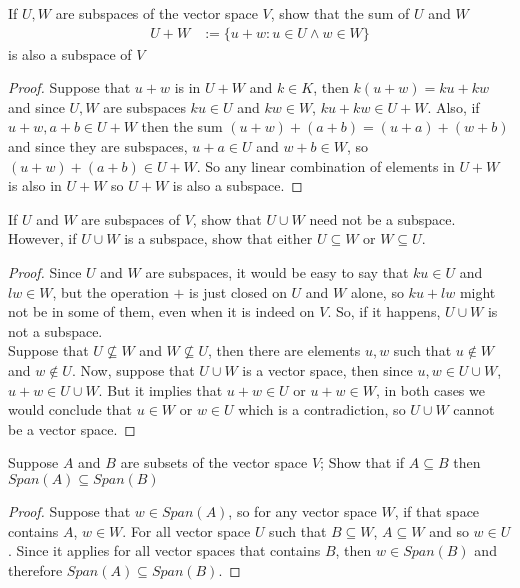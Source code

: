 \documentclass{tufte-handout}
\begin{document}
\begin{problem}
	If $U, W$ are subspaces of the vector space $V$, show that the sum of $U$ and $W$
	\begin{align*}
		U + W &:= \{u+w: u \in U \wedge w \in W \}
	\end{align*}
	is also a subspace of $V$
\end{problem}
\begin{proof}
	Suppose that $u+w$ is in $U+W$ and $k \in K$, then $k(u + w) = ku + kw$ and since $U, W$ are subspaces $ku \in U$ and $kw \in W$, $ku+kw \in U+W$. Also, if $u+w, a+b \in U+W$ then the sum $(u+w) +(a+b) = (u+a) + (w+b)$ and since they are subspaces, $u+a \in U$ and $w+b \in W$, so $(u+w) + (a+b) \in U + W$. So any linear combination of elements in $U+W$ is also in $U+W$ so $U+W$ is also a subspace.
\end{proof}
\begin{problem}
	If $U$ and $W$ are subspaces of $V$, show that $U \cup W$ need not be a subspace. However, if $U \cup W$ is a subspace, show that either $U \subseteq W$ or $W \subseteq U$.
\end{problem}
\begin{proof}
	Since $U$ and $W$ are subspaces, it would be easy to say that $ku \in U$ and $lw \in W$, but the operation $+$ is just closed on $U$ and $W$ alone, so $ku + lw$ might not be in some of them, even when it is indeed on $V$. So, if it happens, $U \cup W$ is not a subspace.\\

	Suppose that $U \not\subseteq W$ and $W \not\subseteq U$, then there are elements $u, w$ such that $u \not \in W$ and $w \not\in U$. Now, suppose that $U \cup W$ is a vector space, then since $u, w \in U \cup W$, $u + w \in U \cup W$. But it implies that $u + w \in U$ or $u + w \in W$, in both cases we would conclude that $u \in W$ or $w \in U$ which is a contradiction, so $U \cup W$ cannot be a vector space.
\end{proof}

\begin{problem}
	Suppose $A$ and $B$ are subsets of the vector space $V$; Show that if $A \subseteq B$ then $Span(A) \subseteq Span(B)$
\end{problem}
\begin{proof}
	Suppose that $w \in Span(A)$, so for any vector space $W$, if that space contains $A$, $w \in W$. For all vector space $U$ such that $B \subseteq W$, $A \subseteq W$ and so $w \in U$. Since it applies for all vector spaces that contains $B$, then $w \in Span(B)$ and therefore $Span(A) \subseteq Span(B)$.
\end{proof}
\end{document}
